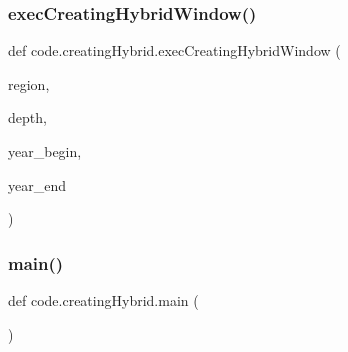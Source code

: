 \subsubsection{\texorpdfstring{exec\+Creating\+Hybrid\+Window()}{execCreatingHybridWindow()}}
{\footnotesize\ttfamily def code.\+creating\+Hybrid.\+exec\+Creating\+Hybrid\+Window (\begin{DoxyParamCaption}\item[{}]{region,  }\item[{}]{depth,  }\item[{}]{year\+\_\+begin,  }\item[{}]{year\+\_\+end }\end{DoxyParamCaption})}

\mbox{\label{namespacecode_1_1creating_hybrid_a727e0bcd9594b737b14900c469ca0318}} 
\subsubsection{\texorpdfstring{main()}{main()}}
{\footnotesize\ttfamily def code.\+creating\+Hybrid.\+main (\begin{DoxyParamCaption}{ }\end{DoxyParamCaption})}

